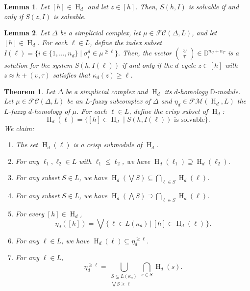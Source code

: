 \documentclass[10pt,a4paper]{amsart}
\newtheorem{lemma}{Lemma}
\newtheorem{theorem}{Theorem}
\DeclareMathOperator{\Ho}{H}
\newcommand{\bbd}{\mathbb{D}}
\newcommand{\calfc}{\mathcal{FC}}
\newcommand{\calfm}{\mathcal{F\!M}}
\begin{document}
\begin{lemma}
\label{lem:shi_welldefined}
Let \([h] \in \Ho_d\) and let \(z \in [h]\). Then, \(S(h,I)\) is solvable if and only if \(S(z,I)\) is solvable.
\end{lemma}

\begin{lemma}
\label{lem:threshold_system}
Let \(\Delta\) be a simplicial complex, let \(\mu \in \calfc(\Delta,L)\), and let \([h] \in \Ho_d\). For each \(\ell \in L\),
define the index subset
\(I(\ell) = \big\{i \in \{1, \ldots, n_d\}\mid \sigma^{d}_{i} \in \mu^{\not\geq \ell}\big\}.\)
Then, the vector 
\(\left( \begin{array}{c} \upsilon \\ \tau \end{array} \right) \in \bbd^{n_U+n_T}\)
is a solution for the system \(S(h, I(\ell))\) if and only if the \(d\)-cycle \(z \in [h]\) with \(z \approx h+(\upsilon,\tau)\) satisfies that \(\kappa_d(z)\geq \ell\).
\end{lemma}

\begin{theorem}
\label{thm:hdl_properties}
Let \(\Delta\) be a simplicial complex and \(\Ho_d\) its \(d\)-homology \(\bbd\)-module. Let \(\mu \in \calfc(\Delta,L)\) be an \(L\)-fuzzy subcomplex of \(\Delta\) and \(\eta_d \in \calfm(\Ho_d,L)\) the \(L\)-fuzzy \(d\)-homology of \(\mu\). For each \(\ell \in L\),
define the crisp subset of \(\Ho_d\):
\[
\Ho_d(\ell) = \big\{[h] \in \Ho_d \mid S(h,I(\ell)) \text{ is solvable} \big\}.
\]
We claim:
\begin{enumerate}[label=(\roman*)]
\item \label{item:hdl_submodule} The set \(\Ho_d(\ell)\) is a crisp submodule of \(\Ho_d\).
\item \label{item:hdl_functor} For any \(\ell_1, \ell_2 \in L\) with \(\ell_1 \leq \ell_2\), we have \(\Ho_d(\ell_1) \supseteq \Ho_d(\ell_2)\).
\item \label{item:hdl_join} For any subset \(S \in L\), we have \(\Ho_d(\bigvee S)\subseteq \bigcap_{\ell \in S} \Ho_d(\ell)\).
\item \label{item:hdl_meet} For any subset \(S \in L\), we have \(\Ho_d(\bigwedge S)\supseteq \bigcap_{\ell \in S} \Ho_d(\ell)\).
\item \label{item:hdl_eta} For every \([h] \in \Ho_d\),
\[
\eta_d([h]) = \bigvee \Big\{\, \ell \in L(\kappa_d) \, \Big| \, [h] \in \Ho_d(\ell) \,\Big\}.
\]
\item \label{item:hdl_contain} For any \(\ell \in L\), we have \(\Ho_d(\ell) \subseteq \eta_d^{\geq \ell}\).
\item \label{item:hdl_cut} For any \(\ell \in L\),
\[
\eta_d^{\geq \ell}
= \bigcup_{\substack{S \subseteq L(\kappa_d) \\ \bigvee S \geq \ell}} \bigcap_{s \in S} \Ho_d(s).
\]
\end{enumerate}
\end{theorem}
\end{document}
